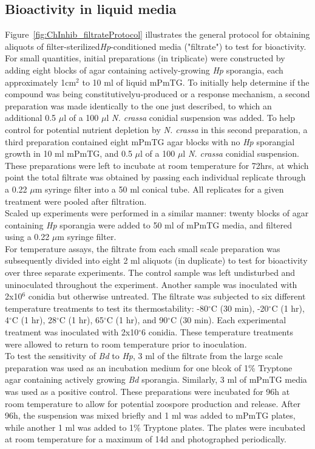 \subsection{Bioactivity in liquid media}
Figure~\ref{fig:ChInhib_filtrateProtocol} illustrates the general protocol for obtaining aliquots of filter-sterilized\textit{Hp}-conditioned media ("filtrate") to test for bioactivity. For small quantities, initial preparations (in triplicate) were constructed by adding eight blocks of agar containing actively-growing \textit{Hp} sporangia, each approximately 1cm$^{2}$ to 10 ml of liquid mPmTG. To initially help determine if the compound was being constitutivelyu-produced or a response mechanism, a second preparation was made identically to the one just described, to which an additional 0.5 $\mu$l of a 100 $\mu$l  \textit{N. crassa} conidial suspension was added. To help control for potential nutrient depletion by \textit{N. crassa} in this second preparation, a third preparation contained eight mPmTG agar blocks with no \textit{Hp} sporangial growth in 10 ml mPmTG, and 0.5 $\mu$l of a 100 $\mu$l \textit{N. crassa} conidial suspension. These preparations were left to incubate at room temperature for 72hrs, at which point the total filtrate was obtained by passing each individual replicate through a 0.22 $\mu$m syringe filter into a 50 ml conical tube. All replicates for a given treatment were pooled after filtration. \\
\indent Scaled up experiments were performed in a similar manner: twenty blocks of agar containing \textit{Hp} sporangia were added to 50 ml of mPmTG media, and filtered using a 0.22 $\mu$m syringe filter.\\
\indent For temperature assays, the filtrate from each small scale preparation was subsequently divided into eight 2 ml aliquots (in duplicate) to test for bioactivity over three separate experiments. The control sample was left undisturbed and uninoculated throughout the experiment. Another sample was inoculated with 2x10$^{6}$ conidia but otherwise untreated. The filtrate was subjected to six different temperature treatments to test its thermostability: -80$^{\circ}$C (30 min), -20$^{\circ}$C (1 hr), 4$^{\circ}$C (1 hr), 28$^{\circ}$C (1 hr), 65$^{\circ}$C (1 hr), and 90$^{\circ}$C (30 min). Each experimental treatment was inoculated with 2x10$^{\circ}$6 conidia. These temperature treatments were allowed to return to room temperature prior to inoculation.\\
\indent To test the sensitivity of \textit{Bd} to \textit{Hp}, 3 ml of the filtrate from the large scale preparation was used as an incubation medium for one blcok of 1\% Tryptone agar containing actively growing \textit{Bd} sporangia. Similarly, 3 ml of mPmTG media was used as a positive control. These preparations were incubated for 96h at room temperature to allow for potential zoospore production and release. After 96h, the suspension was mixed briefly and 1 ml was added to mPmTG plates, while another 1 ml was added to 1\% Tryptone plates. The plates were incubated at room temperature for a maximum of 14d and photographed periodically.\\
